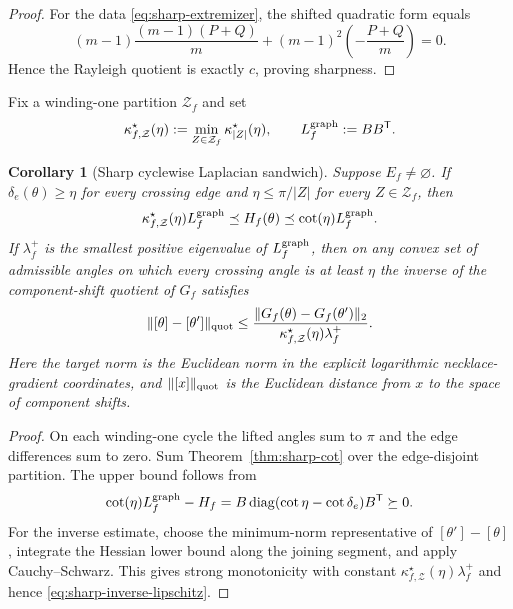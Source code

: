 \documentclass[11pt]{article}
\newtheorem{corollary}[theorem]{Corollary}
\theoremstyle{definition}
\begin{document}
\begin{proof}
For the data \eqref{eq:sharp-extremizer}, the shifted quadratic form equals
\[
 (m-1)\frac{(m-1)(P+Q)}m
 +(m-1)^2\left(-\frac{P+Q}{m}\right)=0.
\]
Hence the Rayleigh quotient is exactly $c$, proving sharpness.
\end{proof}

Fix a winding-one partition $\mathcal Z_f$ and set
\[
 \kappa_{f,\mathcal Z}^\star(\eta)
 :=\min_{Z\in\mathcal Z_f}\kappa_{|Z|}^\star(\eta),
 \qquad L_f^{\rm graph}:=BB^{\mathsf T}.
\]

\begin{corollary}[Sharp cyclewise Laplacian sandwich]
\label{cor:sharp-laplacian-sandwich}
Suppose $E_f\neq\varnothing$. If $\delta_e(\theta)\geq\eta$ for every crossing edge and
$\eta\leq\pi/|Z|$ for every $Z\in\mathcal Z_f$, then
\begin{equation}\label{eq:sharp-laplacian-sandwich}
 \kappa_{f,\mathcal Z}^\star(\eta)L_f^{\rm graph}
 \preceq H_f(\theta)
 \preceq\cot(\eta)L_f^{\rm graph}.
\end{equation}
If $\lambda_f^+$ is the smallest positive eigenvalue of
$L_f^{\rm graph}$, then on any convex set of admissible angles on which
every crossing angle is at least $\eta$ the
inverse of the component-shift quotient of $G_f$ satisfies
\begin{equation}\label{eq:sharp-inverse-lipschitz}
 \|[\theta]-[\theta']\|_{\rm quot}
 \leq
 \frac{\|G_f(\theta)-G_f(\theta')\|_2}
 {\kappa_{f,\mathcal Z}^\star(\eta)\lambda_f^+}.
\end{equation}
Here the target norm is the Euclidean norm in the explicit logarithmic
necklace-gradient coordinates, and $\|[x]\|_{\rm quot}$ is the Euclidean
distance from $x$ to the space of component shifts.
\end{corollary}

\begin{proof}
On each winding-one cycle the lifted angles sum to $\pi$ and the edge
differences sum to zero.  Sum Theorem~\ref{thm:sharp-cot} over the
edge-disjoint partition.  The upper bound follows from
\[
 \cot(\eta)L_f^{\rm graph}-H_f
 =B\operatorname{diag}(\cot\eta-\cot\delta_e)B^{\mathsf T}\succeq0.
\]
For the inverse estimate, choose the minimum-norm representative of
$[\theta']-[\theta]$, integrate the Hessian lower bound along the joining
segment, and apply Cauchy--Schwarz.  This gives strong monotonicity with
constant $\kappa_{f,\mathcal Z}^\star(\eta)\lambda_f^+$ and hence
\eqref{eq:sharp-inverse-lipschitz}.
\end{proof}
\end{document}
